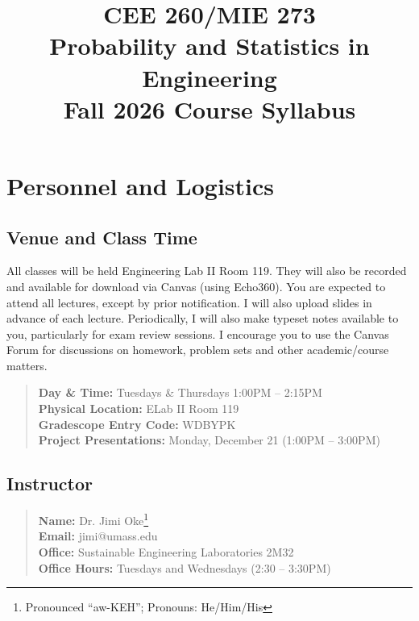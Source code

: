 \documentclass[11pt,twoside]{article}
\numberwithin{equation}{section}
\newcommand{\?}{\stackrel{?}{=}}
\begin{document}
\title{CEE 260/MIE 273 \\
  Probability and Statistics in Engineering \\
Fall 2026  Course Syllabus
}
\date{}
\maketitle

\thispagestyle{empty}

\tableofcontents

\eject
\section{Personnel and Logistics}

\subsection{Venue and Class Time}
All classes will be held Engineering Lab II Room 119. %
They will also be recorded and available for download via Canvas (using Echo360).  You are expected to
attend all lectures, except by prior notification.  I will also upload slides in advance of each lecture.  Periodically,
I will also make typeset notes available to you, particularly for exam review sessions.  I encourage you to use the Canvas
Forum for discussions on homework, problem sets and other
academic/course matters.

\begin{quote}\small
  \textbf{Day \& Time:} Tuesdays \& Thursdays 1:00PM -- 2:15PM\\
  \textbf{Physical Location:} ELab II Room 119\\
 \textbf{Gradescope Entry Code:} WDBYPK\\
\textbf{Project Presentations:} Monday, December 21 (1:00PM -- 3:00PM)
\end{quote}

\subsection{Instructor}
\begin{quote}\small
\textbf{Name:} Dr. Jimi Oke\footnote{Pronounced ``aw-KEH''; Pronouns: He/Him/His} \\
\textbf{Email:} jimi@umass.edu\\
\textbf{Office:} Sustainable Engineering Laboratories 2M32\\
\textbf{Office Hours:} Tuesdays and Wednesdays (2:30 -- 3:30PM)
\end{quote}
\end{document}
